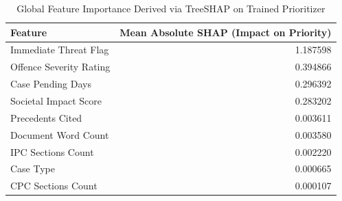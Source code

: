 \begin{table}
\caption{Global Feature Importance Derived via TreeSHAP on Trained Prioritizer}
\label{tab:shap_importance}
\begin{tabular}{lr}
\toprule
Feature & Mean Absolute SHAP (Impact on Priority) \\
\midrule
Immediate Threat Flag & 1.187598 \\
Offence Severity Rating & 0.394866 \\
Case Pending Days & 0.296392 \\
Societal Impact Score & 0.283202 \\
Precedents Cited & 0.003611 \\
Document Word Count & 0.003580 \\
IPC Sections Count & 0.002220 \\
Case Type & 0.000665 \\
CPC Sections Count & 0.000107 \\
\bottomrule
\end{tabular}
\end{table}
